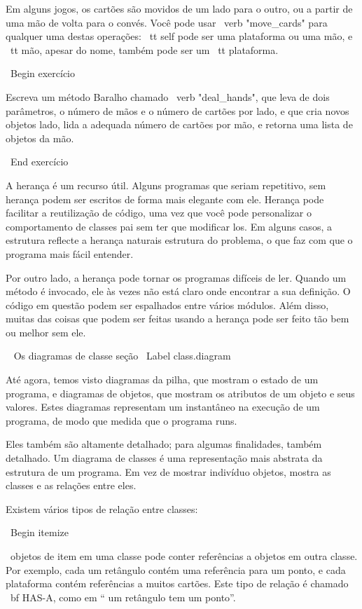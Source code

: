 \documentclass[10pt]{book}
\begin{document}
{{{{{{{{{{{{{{{{Em alguns jogos, os cartões são movidos de um lado para o outro,
ou a partir de uma mão de volta para o convés. Você pode usar \ verb "move_cards"
para qualquer uma destas operações: {\ tt self} pode ser uma plataforma
ou uma mão, e {\ tt mão}, apesar do nome, também pode ser um {\ tt plataforma}.

\ Begin {} exercício

Escreva um método Baralho chamado \ verb "deal_hands", que leva de dois
parâmetros, o número de mãos e o número de cartões por
lado, e que cria novos objetos lado, lida a adequada
número de cartões por mão, e retorna uma lista de objetos da mão.

\ End {} exercício

A herança é um recurso útil. Alguns programas que seriam
repetitivo, sem herança podem ser escritos de forma mais elegante
com ele. Herança pode facilitar a reutilização de código, uma vez que você pode
personalizar o comportamento de classes pai sem ter que modificar
los. Em alguns casos, a estrutura reflecte a herança naturais
estrutura do problema, o que faz com que o programa mais fácil
entender.

Por outro lado, a herança pode tornar os programas difíceis de ler.
Quando um método é invocado, ele às vezes não está claro onde encontrar a sua
definição. O código em questão podem ser espalhados entre vários módulos.
Além disso, muitas das coisas que podem ser feitas usando a herança pode ser
feito tão bem ou melhor sem ele.  


\ {} Os diagramas de classe seção
\ Label {} class.diagram

Até agora, temos visto diagramas da pilha, que mostram o estado de
um programa, e diagramas de objetos, que mostram os atributos
de um objeto e seus valores. Estes diagramas representam um instantâneo
na execução de um programa, de modo que medida que o programa
runs.

Eles também são altamente detalhado; para algumas finalidades, também
detalhado. Um diagrama de classes é uma representação mais abstrata
da estrutura de um programa. Em vez de mostrar indivíduo
objetos, mostra as classes e as relações entre eles.

Existem vários tipos de relação entre classes:

\ Begin {itemize}

\ objetos de item em uma classe pode conter referências a objetos
em outra classe. Por exemplo, cada um retângulo contém uma referência
para um ponto, e cada plataforma contém referências a muitos cartões.
Este tipo de relação é chamado {\ bf HAS-A}, como em `` um retângulo
tem um ponto''.

}}}}}}}}}}}}}}}}
\end{document}
